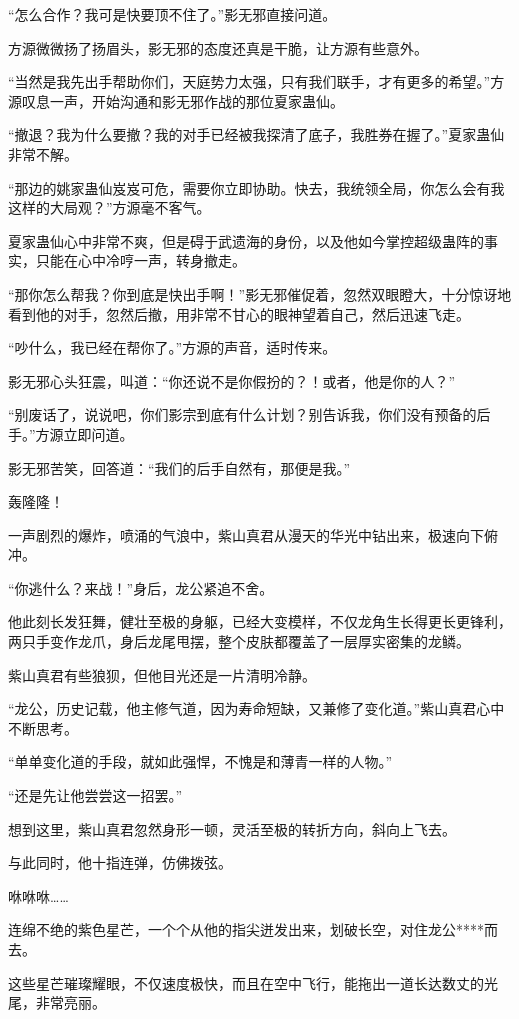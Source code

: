 \begin{this_body}
“怎么合作？我可是快要顶不住了。”影无邪直接问道。

方源微微扬了扬眉头，影无邪的态度还真是干脆，让方源有些意外。

“当然是我先出手帮助你们，天庭势力太强，只有我们联手，才有更多的希望。”方源叹息一声，开始沟通和影无邪作战的那位夏家蛊仙。

“撤退？我为什么要撤？我的对手已经被我探清了底子，我胜券在握了。”夏家蛊仙非常不解。

“那边的姚家蛊仙岌岌可危，需要你立即协助。快去，我统领全局，你怎么会有我这样的大局观？”方源毫不客气。

夏家蛊仙心中非常不爽，但是碍于武遗海的身份，以及他如今掌控超级蛊阵的事实，只能在心中冷哼一声，转身撤走。

“那你怎么帮我？你到底是快出手啊！”影无邪催促着，忽然双眼瞪大，十分惊讶地看到他的对手，忽然后撤，用非常不甘心的眼神望着自己，然后迅速飞走。

“吵什么，我已经在帮你了。”方源的声音，适时传来。

影无邪心头狂震，叫道：“你还说不是你假扮的？！或者，他是你的人？”

“别废话了，说说吧，你们影宗到底有什么计划？别告诉我，你们没有预备的后手。”方源立即问道。

影无邪苦笑，回答道：“我们的后手自然有，那便是我。”

轰隆隆！

一声剧烈的爆炸，喷涌的气浪中，紫山真君从漫天的华光中钻出来，极速向下俯冲。

“你逃什么？来战！”身后，龙公紧追不舍。

他此刻长发狂舞，健壮至极的身躯，已经大变模样，不仅龙角生长得更长更锋利，两只手变作龙爪，身后龙尾甩摆，整个皮肤都覆盖了一层厚实密集的龙鳞。

紫山真君有些狼狈，但他目光还是一片清明冷静。

“龙公，历史记载，他主修气道，因为寿命短缺，又兼修了变化道。”紫山真君心中不断思考。

“单单变化道的手段，就如此强悍，不愧是和薄青一样的人物。”

“还是先让他尝尝这一招罢。”

想到这里，紫山真君忽然身形一顿，灵活至极的转折方向，斜向上飞去。

与此同时，他十指连弹，仿佛拨弦。

咻咻咻……

连绵不绝的紫色星芒，一个个从他的指尖迸发出来，划破长空，对住龙公****而去。

这些星芒璀璨耀眼，不仅速度极快，而且在空中飞行，能拖出一道长达数丈的光尾，非常亮丽。


\end{this_body}
